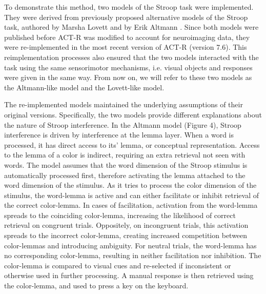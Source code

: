 \documentclass[10pt,letterpaper]{article}
\begin{document}
To demonstrate this method, two models of the Stroop task were implemented. They were derived from previously proposed alternative models of the Stroop task, authored by Marsha Lovett \cite{Lovett2005} and by Erik Altmann \cite{VanMaanen2009}. Since both models were published before ACT-R was modified to account for neuroimaging data, they were re-implemented in the most recent version of ACT-R (version 7.6). This reimplementation processes also ensured that the two models interacted with the task using the same sensorimotor mechanisms, i.e. visual objects and responses were given in the same way. From now on, we will refer to these two models as the Altmann-like model and the Lovett-like model. 

The re-implemented models maintained the underlying assumptions of their original versions. Specifically, the two models provide different explanations about the nature of Stroop interference. In the Altmann model (Figure 4), Stroop interference is driven by interference at the lemma layer. When a word is processed, it has direct access to its' lemma, or conceptual representation. Access to the lemma of a color is indirect, requiring an extra retrieval not seen with words. The model assumes that the word dimension of the Stroop stimulus is automatically processed first, therefore activating the lemma attached to the word dimension of the stimulus. As it tries to process the color dimension of the stimulus, the word-lemma is active and can either facilitate or inhibit retrieval of the correct color-lemma. In cases of facilitation, activation from the word-lemma spreads to the coinciding color-lemma, increasing the likelihood of correct retrieval on congruent trials. Oppositely, on incongruent trials, this activation spreads to the incorrect color-lemma, creating increased competition between color-lemmas and introducing ambiguity. For neutral trials, the word-lemma has no corresponding color-lemma, resulting in neither facilitation nor inhibition. The color-lemma is compared to visual cues and re-selected if inconsistent or otherwise used in further processing. A manual response is then retrieved using the color-lemma, and used to press a key on the keyboard. 
\end{document}
